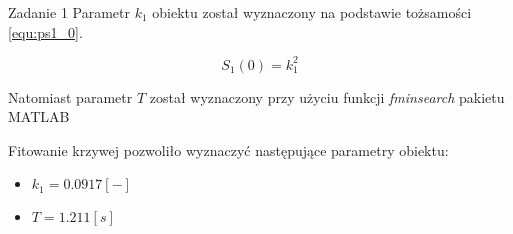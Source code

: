 \documentclass[12pt]{article}
\begin{document}
\begin{section}{Zadanie 1}
    Parametr $k_1$ obiektu został wyznaczony na podstawie tożsamości
    \ref{equ:ps1_0}.
    
    \begin{equation}
      S_1(0)=k_1^2
      \label{equ:ps1_0}
    \end{equation} 
    \vspace{0.2cm}
    
    Natomiast parametr $T$ został wyznaczony przy użyciu funkcji
    \textit{fminsearch} pakietu \textrm{MATLAB}
    
    Fitowanie krzywej pozwoliło wyznaczyć następujące parametry obiektu:
    \begin{itemize}
      \item $k_1 = 0.0917 [-]$
      \item $T = 1.211 [s]$
    \end{itemize}
  \end{section}
  
  \newpage
\end{document}
